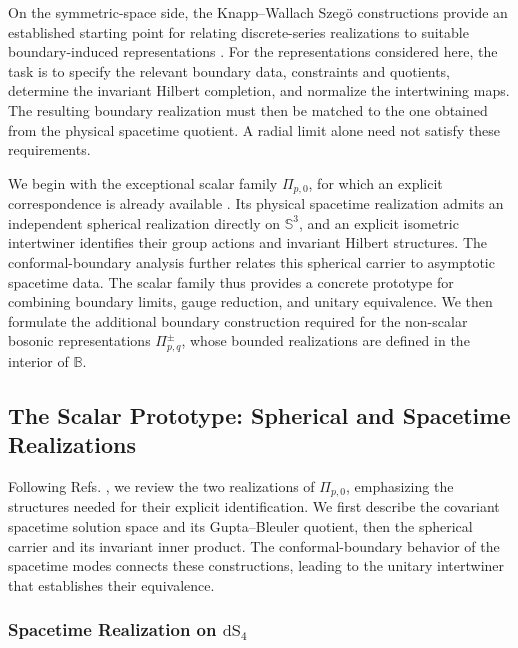 \documentclass{SciPost}
\begin{document}
On the symmetric-space side, the Knapp--Wallach Szeg\"o constructions provide an established starting point for relating discrete-series realizations to suitable boundary-induced representations \cite{KnappWallach1976, KnappWallach1980}. For the representations considered here, the task is to specify the relevant boundary data, constraints and quotients, determine the invariant Hilbert completion, and normalize the intertwining maps. The resulting boundary realization must then be matched to the one obtained from the physical spacetime quotient. A radial limit alone need not satisfy these requirements.

We begin with the exceptional scalar family $\Pi_{p,0}$, for which an explicit correspondence is already available \cite{Bajalan2026, bajalan2026araki}. Its physical spacetime realization admits an independent spherical realization directly on $\mathbb S^3$, and an explicit isometric intertwiner identifies their group actions and invariant Hilbert structures. The conformal-boundary analysis further relates this spherical carrier to asymptotic spacetime data. The scalar family thus provides a concrete prototype for combining boundary limits, gauge reduction, and unitary equivalence. We then formulate the additional boundary construction required for the non-scalar bosonic representations $\Pi^\pm_{p,q}$, whose bounded realizations are defined in the interior of $\mathbb B$.


\subsection{The Scalar Prototype: Spherical and Spacetime Realizations} \label{subsubsec:scalar-prototype}

Following Refs. \cite{Bajalan2026,bajalan2026araki}, we review the two realizations of $\Pi_{p,0}$, emphasizing the structures needed for their explicit identification. We first describe the covariant spacetime solution space and its Gupta--Bleuler quotient, then the spherical carrier and its invariant inner product. The conformal-boundary behavior of the spacetime modes connects these constructions, leading to the unitary intertwiner that establishes their equivalence.


\subsubsection{Spacetime Realization on $\mathrm{dS}_4$}
\end{document}
